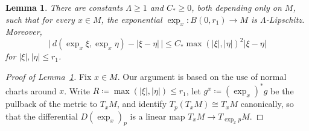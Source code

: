 \documentclass[10pt,a4paper]{amsart}
\newtheorem{lem}{Lemma}
\begin{document}
\begin{lem}
\label{lem:exp.estimates}
    There are constants \( \Lambda\ge1 \) and \( C_\ast\ge0 \), both depending only on \( M \), such that for every \( x\in M \), the exponential \(\exp_x: B(0, r_1) \to M\) is \(\Lambda\)-Lipschitz.
    Moreover, 
    \[
        \big\lvert\,d(\exp_x\xi,\exp_x\eta)-\lvert\xi-\eta\rvert\,\big\rvert \le C_\ast\max(\lvert\xi\rvert,\lvert\eta\rvert)^2\lvert\xi-\eta\rvert 
    \] 
    for \(\lvert \xi \rvert, \lvert \eta\rvert \le r_1\). 
\end{lem}

\begin{proof}[Proof of Lemma~\ref{lem:exp.estimates}]
    Fix \(x \in M\).
    Our argument is based on the use of normal charts around \(x\).
    Write \( R\coloneqq \max(\lvert\xi\rvert,\lvert\eta\rvert)\le r_1 \), let \( g^x\coloneqq (\exp_x)^\ast g \) be the pullback of the metric to \( T_xM \), and identify \( T_p(T_xM)\cong T_xM \) canonically, so that the differential \( D(\exp_x)_p \) is a linear map \( T_xM\to T_{\exp_xp}M \).


\end{proof}
\end{document}
